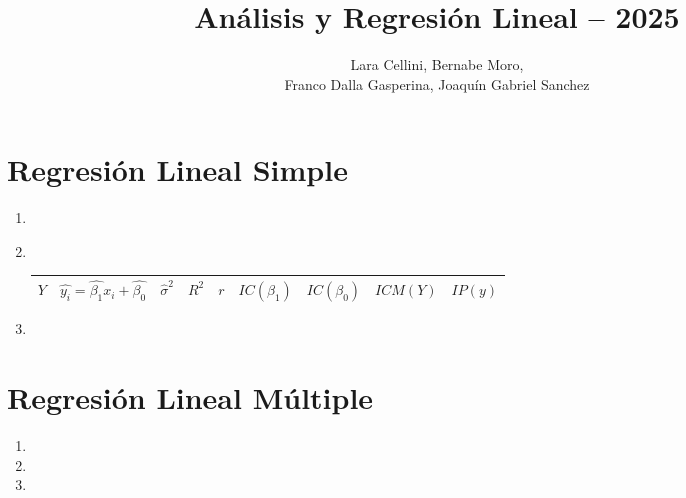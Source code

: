 \documentclass[spanish,12pt,a4paper]{article}
\title{Análisis y Regresión Lineal – 2025}
\author{Lara Cellini, Bernabe Moro,\\Franco Dalla Gasperina, Joaquín Gabriel Sanchez}
\begin{document}
	
	\maketitle
	
	\section{Regresión Lineal Simple}
	
	\begin{enumerate}[label=\alph*)]
		\item 
		\item ~
		\begin{table}[h!]
			\centering
			\bgroup
			\def\arraystretch{1.5}
			\begin{tabular}{|c|c|c|c|c|c|c|c|c|}\hline
				$Y$ & $\hat{y_i} = \hat{\beta_1}x_i+\hat{\beta_0}$ & $\hat{\sigma}^2$ & $R^2$ & $r$ & $IC(\beta_1)$ & $IC(\beta_0)$ & $ICM(Y)$ & $IP(y)$\\\hline
			\end{tabular}
			\egroup
		\end{table}
		\item
	\end{enumerate}
	
	\section{Regresión Lineal Múltiple}
	
	\begin{enumerate}[label=\alph*)]
		\item 
		\item 
		\item
	\end{enumerate}
\end{document}
